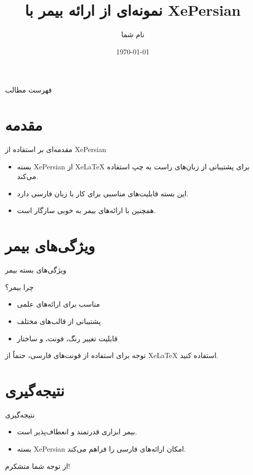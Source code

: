 \documentclass{beamer}
\title[نمونه ارائه]{نمونه‌ای از ارائه بیمر با XePersian}
\author{نام شما}
\institute{موسسه شما}
\date{\today}
\begin{document}
	
	\begin{frame}
		\titlepage
	\end{frame}
	
	\begin{frame}{فهرست مطالب}
		\tableofcontents
	\end{frame}
	
	\section{مقدمه}
	\begin{frame}{مقدمه‌ای بر استفاده از XePersian}
		\begin{itemize}
			\item بسته XePersian از XeLaTeX برای پشتیبانی از زبان‌های راست به چپ استفاده می‌کند.
			\item این بسته قابلیت‌های مناسبی برای کار با زبان فارسی دارد.
			\item همچنین با ارائه‌های بیمر به خوبی سازگار است.
		\end{itemize}
	\end{frame}
	
	\section{ویژگی‌های بیمر}
	\begin{frame}{ویژگی‌های بسته بیمر}
		\begin{block}{چرا بیمر؟}
			\begin{itemize}
				\item مناسب برای ارائه‌های علمی
				\item پشتیبانی از قالب‌های مختلف
				\item قابلیت تغییر رنگ، فونت، و ساختار
			\end{itemize}
		\end{block}
		
		\begin{alertblock}{توجه}
			برای استفاده از فونت‌های فارسی، حتماً از XeLaTeX استفاده کنید.
		\end{alertblock}
	\end{frame}
	
	\section{نتیجه‌گیری}
	\begin{frame}{نتیجه‌گیری}
		\begin{itemize}
			\item بیمر ابزاری قدرتمند و انعطاف‌پذیر است.
			\item بسته XePersian امکان ارائه‌های فارسی را فراهم می‌کند.
		\end{itemize}
		\bigskip
		\centering
		از توجه شما متشکرم!
	\end{frame}
	
\end{document}
